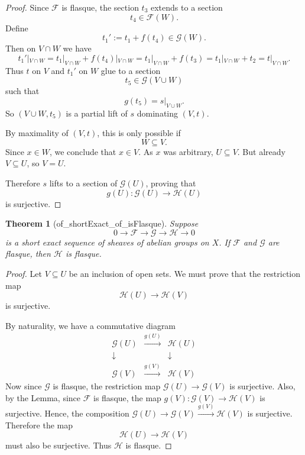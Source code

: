 \documentclass{article}
\newtheorem{theorem}{Theorem}
\begin{document}
\begin{proof}
Since \(\mathcal F\) is flasque, the section \(t_3\) extends to a section
\[
t_4 \in \mathcal F(W).
\]
Define
\[
t_1' := t_1 + f(t_4) \in \mathcal G(W).
\]
Then on \(V\cap W\) we have
\[
t_1'|_{V\cap W}
=
t_1|_{V\cap W} + f(t_4)|_{V\cap W}
=
t_1|_{V\cap W} + f(t_3)
=
t_1|_{V\cap W} + t_2
=
t|_{V\cap W}.
\]
Thus \(t\) on \(V\) and \(t_1'\) on \(W\) glue to a section
\[
t_5 \in \mathcal G(V \cup W)
\]
such that
\[
g(t_5)=s|_{V\cup W}.
\]
So \((V \cup W, t_5)\) is a partial lift of \(s\) dominating \((V,t)\).

By maximality of \((V,t)\), this is only possible if
\[
W \subseteq V.
\]
Since \(x \in W\), we conclude that \(x \in V\).
As \(x\) was arbitrary, \(U \subseteq V\).
But already \(V \subseteq U\), so \(V=U\).

Therefore \(s\) lifts to a section of \(\mathcal G(U)\), proving that
\[
g(U) : \mathcal G(U)\to \mathcal H(U)
\]
is surjective.
\end{proof}

\begin{theorem}[of_shortExact_of_isFlasque]\label{thm:quotient-flasque}
Suppose
\[
0 \to \mathcal F \to \mathcal G \to \mathcal H \to 0
\]
is a short exact sequence of sheaves of abelian groups on \(X\).
If \(\mathcal F\) and \(\mathcal G\) are flasque, then \(\mathcal H\) is flasque.
\end{theorem}

\begin{proof}
Let \(V \subseteq U\) be an inclusion of open sets. We must prove that the restriction map
\[
\mathcal H(U)\to \mathcal H(V)
\]
is surjective.

By naturality, we have a commutative diagram
\[
\begin{array}{ccc}
    \mathcal G(U) & \xrightarrow{g(U)} &\mathcal H(U) \\
    \downarrow & & \downarrow\\
      \mathcal G(V) & \xrightarrow{g(V)}& \mathcal H(V)
\end{array}
\]
Now since \(\mathcal G\) is flasque, the restriction map \(\mathcal G(U)\to \mathcal G(V)\)
is surjective. Also, by the Lemma, since \(\mathcal F\) is flasque, the map \(g(V):\mathcal G(V)\to \mathcal H(V)\) is surjective. Hence, the composition \(
\mathcal G(U)\to \mathcal G(V)\xrightarrow{g(V)} \mathcal H(V)
\) is surjective. Therefore the map
\[
\mathcal H(U)\to \mathcal H(V)
\]
must also be surjective. Thus \(\mathcal H\) is flasque.
\end{proof}
\end{document}
